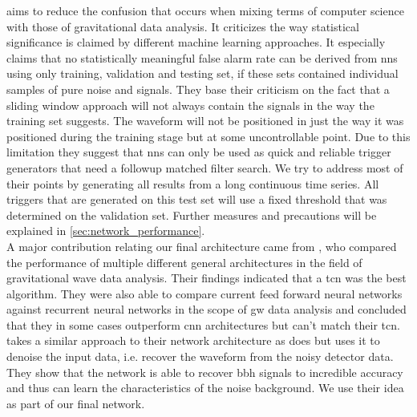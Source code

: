 \cite{cnn_magiacal_bullet} aims to reduce the confusion that occurs when mixing terms of computer science with those of gravitational data analysis. It criticizes the way statistical significance is claimed by different machine learning approaches. It especially claims that no statistically meaningful false alarm rate can be derived from \gls{nn}s using only training, validation and testing set, if these sets contained individual samples of pure noise and signals. They base their criticism on the fact that a sliding window approach will not always contain the signals in the way the training set suggests. The waveform will not be positioned in just the way it was positioned during the training stage but at some uncontrollable point. Due to this limitation they suggest that \gls{nn}s can only be used as quick and reliable trigger generators that need a followup matched filter search. We try to address most of their points by generating all results from a long continuous time series. All triggers that are generated on this test set will use a fixed threshold that was determined on the validation set. Further measures and precautions will be explained in \autoref{sec:network_performance}.\\
A major contribution relating our final architecture came from \cite{tcn_idea}, who compared the performance of multiple different general architectures in the field of gravitational wave data analysis. Their findings indicated that a \gls{tcn} was the best algorithm. They were also able to compare current feed forward neural networks against recurrent neural networks in the scope of \gls{gw} data analysis and concluded that they in some cases outperform \gls{cnn} architectures but can't match their \gls{tcn}.\\
\cite{dnn_denoising} takes a similar approach to their network architecture as \cite{tcn_idea} does but uses it to denoise the input data, i.e. recover the waveform from the noisy detector data. They show that the network is able to recover \gls{bbh} signals to incredible accuracy and thus can learn the characteristics of the noise background. We use their idea as part of our final network.